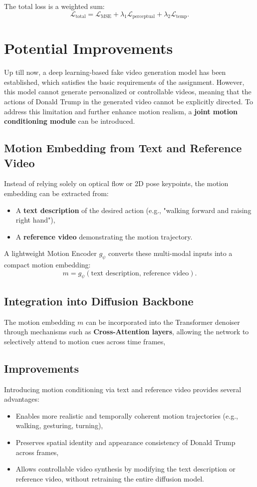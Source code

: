 \documentclass[11pt,a4paper]{article}
\begin{document}
The total loss is a weighted sum:
\[
\mathcal{L}_{\text{total}} = \mathcal{L}_{\text{MSE}} + \lambda_1 \mathcal{L}_{\text{perceptual}} + \lambda_2 \mathcal{L}_{\text{temp}}.
\]

\section{Potential Improvements}
Up till now, a deep learning-based fake video generation model has been established, which satisfies the basic requirements of the assignment. 
However, this model cannot generate personalized or controllable videos, meaning that the actions of Donald Trump in the generated video cannot be explicitly directed. 
To address this limitation and further enhance motion realism, a \textbf{joint motion conditioning module} can be introduced.

\subsection{Motion Embedding from Text and Reference Video}
Instead of relying solely on optical flow or 2D pose keypoints, the motion embedding can be extracted from:
\begin{itemize}
    \item A \textbf{text description} of the desired action (e.g., "walking forward and raising right hand"),
    \item A \textbf{reference video} demonstrating the motion trajectory.
\end{itemize}
A lightweight Motion Encoder $g_\psi$ converts these multi-modal inputs into a compact motion embedding:
\[
m = g_\psi(\text{text description, reference video}).
\]

\subsection{Integration into Diffusion Backbone}
The motion embedding $m$ can be incorporated into the Transformer denoiser through mechanisms such as \textbf{Cross-Attention layers}, allowing the network to selectively attend to motion cues across time frames,

\subsection{Improvements}
Introducing motion conditioning via text and reference video provides several advantages:
\begin{itemize}
    \item Enables more realistic and temporally coherent motion trajectories (e.g., walking, gesturing, turning),
    \item Preserves spatial identity and appearance consistency of Donald Trump across frames,
    \item Allows controllable video synthesis by modifying the text description or reference video, without retraining the entire diffusion model.
\end{itemize}
\end{document}
